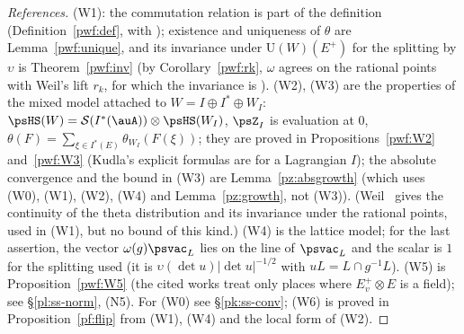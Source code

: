 \documentclass[10pt]{amsart}
\theoremstyle{definition}
\theoremstyle{remark}
\providecommand{\auS}{\mathcal S}
\providecommand{\auU}{\mathrm U}
\begin{document}
\begin{proof}[References]
(W1): the commutation relation is part of the definition (Definition~\ref{pwf:def}, with
\cite[Th\'eor\`eme~1 and no.~34]{WeilActa}); existence and uniqueness of $\theta$ are
Lemma~\ref{pwf:unique}, and its invariance under $\auU(W)(E^+)$ for the splitting by $\upsilon$ is
Theorem~\ref{pwf:inv} (by Corollary~\ref{pwf:rk}, $\omega$ agrees on the rational points with Weil's
lift $r_k$, for which the invariance is \cite[Th\'eor\`eme~6]{WeilActa}). (W2), (W3) are the
properties of the mixed model attached to $W=I\oplus I^*\oplus W_I$: $\psHS(W)=\auS(I^*(\auA))
\otimes\psHS(W_I)$, $\psZ_I$ is evaluation at $0$, $\theta(F)=\sum_{\xi\in I^*(E)}\theta_{W_I}(F(\xi))$;
they are proved in Propositions~\ref{pwf:W2} and~\ref{pwf:W3} (Kudla's explicit formulas \cite[\S5]{KudlaSplitting} are
for a Lagrangian $I$); the absolute
convergence and the bound in (W3) are Lemma~\ref{pz:absgrowth} (which uses (W0), (W1), (W2), (W4) and
Lemma~\ref{pz:growth}, not (W3)). (Weil~\cite[Th\'eor\`eme~6]{WeilActa} gives the continuity of the theta
distribution and its invariance under the rational points, used in (W1), but no bound of this kind.)
(W4) is the lattice model; for the last assertion, the vector
$\omega(g)\psvac_L$ lies on the line of $\psvac_L$ and the scalar is $1$ for the splitting used
(it is $\upsilon(\det u)|\det u|^{-1/2}$ with $uL=L\cap g^{-1}L$). (W5) is Proposition~\ref{pwf:W5}
(the cited works treat only places where $E^+_v\otimes E$ is a field); see \S\ref{pl:ss-norm}, (N5). For (W0) see \S\ref{pk:ss-conv}; (W6) is proved in
Proposition~\ref{pf:flip} from (W1), (W4) and the local form of (W2).
\end{proof}
\end{document}
